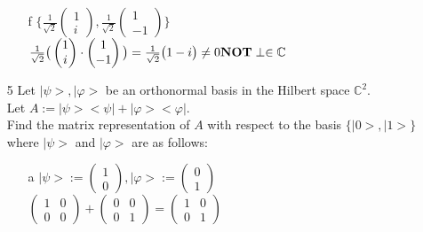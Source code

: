 \documentclass[11 pt]{article}
\theoremstyle{definition}
\theoremstyle{definition}
\def\ket#1{\big|{#1}\big>}
\def\bra#1{\big<{#1}\big|}
\begin{document}
\begin{enumerate}
\begin{enumerate}
\item[f] $\{\frac{1}{\sqrt{2}}\left(\begin{matrix}1\\i\end{matrix}\right) ,\frac{1}{\sqrt{2}}\left(\begin{matrix}1\\-1\end{matrix}\right)\}$\\
\hspace*{1.2cm} $\frac{1}{\sqrt{2}}\big(\left(\begin{matrix}1\\i\end{matrix}\right)\cdot\left(\begin{matrix}1\\-1\end{matrix}\right)\big) = \frac{1}{\sqrt{2}} \big( 1 - i \big) \neq 0\\ \textbf{NOT}\perp\in\mathbb{C}$\\
\end{enumerate}
\newpage
\item[5] Let $\ket{\psi},\ket{\varphi}$ be an orthonormal basis in the Hilbert space $\mathbb{C}^2$.\\
Let $A := \ket{\psi}\bra{\psi} + \ket{\varphi}\bra{\varphi}$.\\
\vspace*{1cm}
Find the matrix representation of $A$ with respect to the basis $\{\ket{0}, \ket{1}\}$ where $\ket{\psi}$ and $\ket{\varphi}$ are as follows:\\
\begin{enumerate}
\item[a] $\ket{\psi} := \left(\begin{matrix}1\\0\end{matrix}\right), \ket{\varphi} := \left( \begin{matrix}0\\1\end{matrix}\right)$\\
\hspace*{1.2cm} $\left( \begin{array}{cc}1&0\\0&0\end{array}\right) + \left( \begin{array}{cc}0&0\\0&1\end{array}\right) = \left( \begin{array}{cc}1&0\\0&1\end{array}\right)$\\


\end{enumerate}
\end{enumerate}
\end{document}
